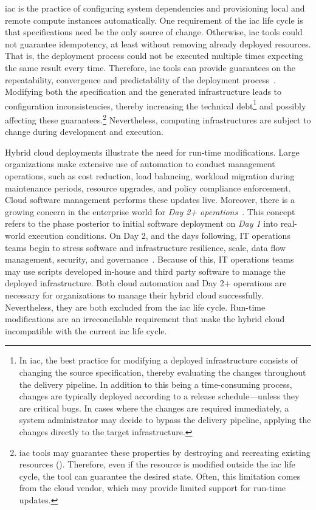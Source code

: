 \gls{iac} is the practice of configuring system dependencies and provisioning local and remote compute instances automatically. One requirement of the \gls{iac} life cycle is that specifications need be the only source of change. Otherwise, \gls{iac} tools could not guarantee idempotency, at least without removing already deployed resources. That is, the deployment process could not be executed multiple times expecting the same result every time. Therefore, \gls{iac} tools can provide guarantees on the repeatability, convergence and predictability of the deployment process~\cite{nelson-smith-2013-test,waldemar-2013-testing}. Modifying both the specification and the generated infrastructure leads to configuration inconsistencies, thereby increasing the technical debt\footnote{In \gls{iac}, the best practice for modifying a deployed infrastructure consists of changing the source specification, thereby evaluating the changes throughout the delivery pipeline. In addition to this being a time-consuming process, changes are typically deployed according to a release schedule---unless they are critical bugs. In cases where the changes are required immediately, a system administrator may decide to bypass the delivery pipeline, applying the changes directly to the target infrastructure.} and possibly affecting these guarantees.\footnote{\gls{iac} tools may guarantee these properties by destroying and recreating existing resources (). Therefore, even if the resource is modified outside the \gls{iac} life cycle, the tool can guarantee the desired state. Often, this limitation comes from the cloud vendor, which may provide limited support for run-time updates.} Nevertheless, computing infrastructures are subject to change during development and execution.

Hybrid cloud deployments illustrate the need for run-time modifications. Large organizations make extensive use of automation to conduct management operations, such as cost reduction, load balancing, workload migration during maintenance periods, resource upgrades, and policy compliance enforcement. Cloud software management performs these updates live. Moreover, there is a growing concern in the enterprise world for \emph{Day 2+ operations}~\cite{cherinka-2022-impact}. This concept refers to the phase posterior to initial software deployment on \emph{Day 1} into real-world execution conditions. On Day 2, and the days following, IT operations teams begin to stress software and infrastructure resilience, scale, data flow management, security, and governance~\cite{cherinka-2022-impact}. Because of this, IT operations teams may use scripts developed in-house and third party software to manage the deployed infrastructure. Both cloud automation and Day 2+ operations are necessary for organizations to manage their hybrid cloud successfully. Nevertheless, they are both excluded from the \gls{iac} life cycle. Run-time modifications are an irreconcilable requirement that make the hybrid cloud incompatible with the current \gls{iac} life cycle.

